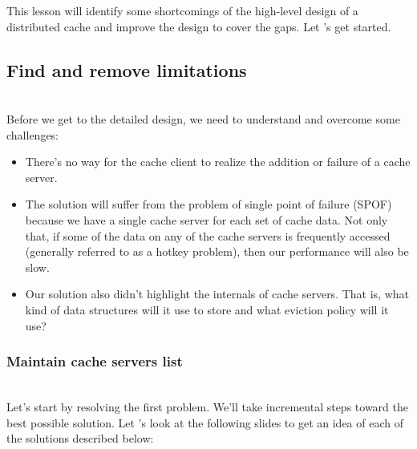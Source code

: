 

This lesson will identify some shortcomings of the high-level design of a distributed cache and improve the design to cover the gaps. Let 's get started.

\subsection{Find and remove limitations}\label{DwPNU1ZpvZcDgy8RiaQvI}
\\
Before we get to the detailed design, we need to understand and overcome some challenges:

\begin{itemize}
\item
\protect{}\label{KOgQFQ0fEwLlxL_vKKzXN}
There's no way for the cache client to realize the addition or failure of a cache server.
\item
\protect{}\label{DmjYOmBhEnLGKdwvKC9dd}
The solution will suffer from the problem of single point of failure (SPOF) because we have a single cache server for each set of cache data. Not only that, if some of the data on any of the cache servers is frequently accessed (generally referred to as a hotkey problem), then our performance will also be slow.
\item
\protect{}\label{N-LojsubzsFXbB8PYBzoo}
Our solution also didn't highlight the internals of cache servers. That is, what kind of data structures will it use to store and what eviction policy will it use?\\
\end{itemize}

\subsubsection{Maintain cache servers list}\label{6XsX4IpkW33QDoUCw43mL}
\\
Let's start by resolving the first problem. We'll take incremental steps toward the best possible solution. Let 's look at the following slides to get an idea of each of the solutions described below:

